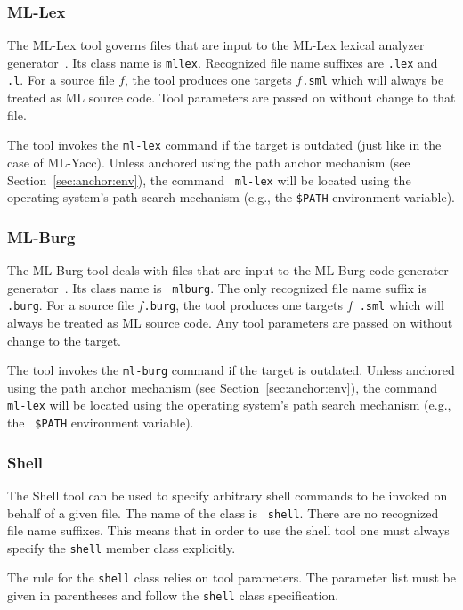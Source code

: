 \subsubsection{ML-Lex}

The ML-Lex tool governs files that are input to the ML-Lex lexical
analyzer generator~\cite{appel89:lex}.  Its class name is {\tt mllex}.
Recognized file name suffixes are {\tt .lex} and {\tt .l}.  For a
source file $f$, the tool produces one targets $f${\tt .sml} which
will always be treated as ML source code.  Tool parameters are passed
on without change to that file.

The tool invokes the {\tt ml-lex} command if the target is outdated
(just like in the case of ML-Yacc).  Unless anchored using the path
anchor mechanism (see Section~\ref{sec:anchor:env}), the command {\tt
ml-lex} will be located using the operating system's path search
mechanism (e.g., the {\tt \$PATH} environment variable).

\subsubsection{ML-Burg}

The ML-Burg tool deals with files that are input to the ML-Burg
code-generater generator~\cite{mlburg93}.  Its class name is {\tt
mlburg}.  The only recognized file name suffix is {\tt .burg}.  For a
source file $f${\tt .burg}, the tool produces one targets $f${\tt
.sml} which will always be treated as ML source code.  Any tool
parameters are passed on without change to the target.

The tool invokes the {\tt ml-burg} command if the target is outdated.
Unless anchored using the path anchor mechanism (see
Section~\ref{sec:anchor:env}), the command {\tt ml-lex} will be located
using the operating system's path search mechanism (e.g., the {\tt
\$PATH} environment variable).

\subsubsection{Shell}

The Shell tool can be used to specify arbitrary shell commands to be
invoked on behalf of a given file.  The name of the class is {\tt
shell}.  There are no recognized file name suffixes.  This means that
in order to use the shell tool one must always specify the {\tt shell}
member class explicitly.

The rule for the {\tt shell} class relies on tool parameters.  The
parameter list must be given in parentheses and follow the {\tt shell}
class specification.

